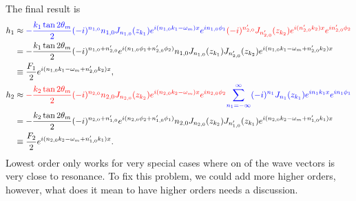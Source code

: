 \documentclass[letterpaper,12pt,english]{sphinxmanual}
\begin{document}
The final result is
\begin{equation*}
\begin{split}h_1 & \approx {\color{blue}-\frac{k_1 \tan 2\theta_m}{2} (-i)^{n_{1,0}} n_{1,0} J_{n_{1,0}} (z_{k_1}) e^{i (n_{1,0} k_1-\omega_m)x} e^{i n_{1,0}\phi_1} } {\color{red} (-i)^{n'_{2,0}} J_{n'_{2,0}}(z_{k_2}) e^{i(n'_{2,0}k_2)x} e^{i n'_{2,0} \phi_2}  } \\
& = -\frac{k_1 \tan 2\theta_m}{2} (-i)^{ n_{1,0}+n'_{2,0} }   e^{i (n_{1,0}\phi_1 + n'_{2,0} \phi_2)} n_{1,0} J_{n_{1,0}} (z_{k_1})  J_{n'_{2,0}}(z_{k_2}) e^{i(n_{1,0} k_1-\omega_m + n'_{2,0}k_2)x}  \\
& \equiv \frac{F_1}{2} e^{i(n_{1,0} k_1-\omega_m + n'_{2,0}k_2)x}  , \\
h_2 & \approx {\color{red} - \frac{k_2\tan 2\theta_m}{2} (-i)^{n_{2,0}} n_{2,0} J_{n_{2,0}}(z_{k_2}) e^{i(n_{2,0}k_2-\omega_m)x} e^{i n_{2,0} \phi_2}  }{\color{blue} \sum_{n_1=-\infty}^{\infty} (-i)^{n_1} J_{n_1}(z_{k_1}) e^{in_1 k_1 x} e^{i n_1 \phi_1} } \\
& = - \frac{k_2\tan 2\theta_m}{2} (-i)^{n_{2,0}+ n'_{1,0} }   e^{i (n_{2,0} \phi_2 + n'_{1,0} \phi_1)}  n_{2,0} J_{n_{2,0}}(z_{k_2}) J_{n'_{1,0}}(z_{k_1})  e^{i(n_{2,0}k_2-\omega_m+ n'_{1,0} k_1)x} \\
& \equiv \frac{F_2}{2} e^{i(n_{2,0}k_2-\omega_m+ n'_{1,0} k_1)x} .\end{split}
\end{equation*}
Lowest order only works for very special cases where on of the wave vectors is very close to resonance. To fix this problem, we could add more higher orders, however, what does it mean to have higher orders needs a discussion.
\end{document}
